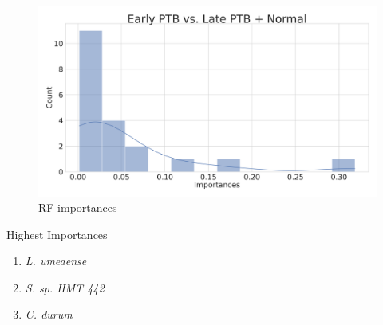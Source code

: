 \documentclass{beamer}
\begin{document}
\begin{frame}[allowframebreaks]
        \begin{figure}
            \includegraphics[width=0.8 \linewidth]{figures/RandomForest_Proportion/RF-two.DADA2.homd.Mouth/importances.pdf}
            \caption{RF importances}
        \end{figure}

        \begin{block}{Highest Importances}
            \begin{enumerate}
                \item \textit{L. umeaense}
                \item \textit{S. sp. HMT 442}
                \item \textit{C. durum}
            \end{enumerate}
        \end{block}
    \end{frame}
\end{document}

